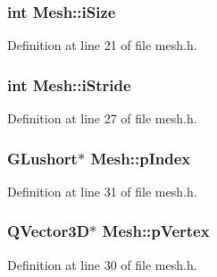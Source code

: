 \subsubsection[{i\+Size}]{\setlength{\rightskip}{0pt plus 5cm}int Mesh\+::i\+Size\hspace{0.3cm}{\ttfamily [protected]}}\label{class_mesh_ac6283b99dbb698e2efd83357278b06b7}


Definition at line 21 of file mesh.\+h.

\hypertarget{class_mesh_afe2f0742c0ef6088eaf38b87a8896392}{}
\subsubsection[{i\+Stride}]{\setlength{\rightskip}{0pt plus 5cm}int Mesh\+::i\+Stride\hspace{0.3cm}{\ttfamily [protected]}}\label{class_mesh_afe2f0742c0ef6088eaf38b87a8896392}


Definition at line 27 of file mesh.\+h.

\hypertarget{class_mesh_a96ad2c21d6a2da165217d5ff53ec72b4}{}
\subsubsection[{p\+Index}]{\setlength{\rightskip}{0pt plus 5cm}G\+Lushort$\ast$ Mesh\+::p\+Index\hspace{0.3cm}{\ttfamily [protected]}}\label{class_mesh_a96ad2c21d6a2da165217d5ff53ec72b4}


Definition at line 31 of file mesh.\+h.

\hypertarget{class_mesh_a32d007d7d539832b7feb35e11ff4586c}{}
\subsubsection[{p\+Vertex}]{\setlength{\rightskip}{0pt plus 5cm}Q\+Vector3\+D$\ast$ Mesh\+::p\+Vertex\hspace{0.3cm}{\ttfamily [protected]}}\label{class_mesh_a32d007d7d539832b7feb35e11ff4586c}


Definition at line 30 of file mesh.\+h.

\hypertarget{class_mesh_ae53507ed0f2756e37a55e57a169cbec0}{}
